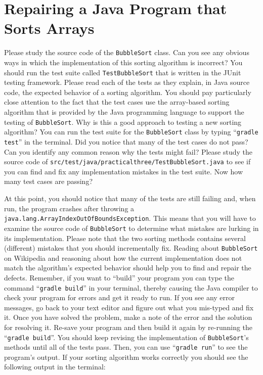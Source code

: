 \documentclass[11pt]{article}
\newcommand{\mainprogram}{\lstinline{BubbleSort}}
\newcommand{\testprogram}{\lstinline{TestBubbleSort}}
\newcommand{\testprogramsource}{\lstinline{src/test/java/practicalthree/TestBubbleSort.java}}
\newcommand{\gradlebuild}{\command{gradle build}}
\newcommand{\gradletest}{\command{gradle test}}
\newcommand{\gradlerun}{\command{gradle run}}
\newcommand{\command}[1]{``\lstinline{#1}''}
\newcommand{\program}[1]{\lstinline{#1}}
\newcommand{\step}[1]{``{#1}''}
\begin{document}
\section*{Repairing a Java Program that Sorts Arrays}

Please study the source code of the \mainprogram{} class. Can you see any
obvious ways in which the implementation of this sorting algorithm is incorrect?
You should run the test suite called \testprogram{} that is written in the JUnit
testing framework. Please read each of the tests as they explain, in Java source
code, the expected behavior of a sorting algorithm. You should pay particularly
close attention to the fact that the test cases use the array-based sorting
algorithm that is provided by the Java programming language to support the
testing of \mainprogram{}. Why is this a good approach to testing a new sorting
algorithm? You can run the test suite for the \mainprogram{} class by typing
\gradletest{} in the terminal. Did you notice that many of the test cases do not
pass? Can you identify any common reason why the tests might fail? Please study
the source code of \testprogramsource{} to see if you can find and fix any
implementation mistakes in the test suite. Now how many test cases are passing?

At this point, you should notice that many of the tests are still failing and,
when run, the program crashes after throwing a
\program{java.lang.ArrayIndexOutOfBoundsException}. This means that you will
have to examine the source code of \mainprogram{} to determine what mistakes are
lurking in its implementation. Please note that the two sorting methods contains
several (different) mistakes that you should incrementally fix. Reading about
\mainprogram{} on Wikipedia and reasoning about how the current implementation
does not match the algorithm's expected behavior should help you to find and
repair the defects. Remember, if you want to \step{build} your program you can
type the command \gradlebuild{} in your terminal, thereby causing the Java
compiler to check your program for errors and get it ready to run. If you see
any error messages, go back to your text editor and figure out what you
mis-typed and fix it. Once you have solved the problem, make a note of the error
and the solution for resolving it. Re-save your program and then build it again
by re-running the \gradlebuild{}. You should keep revising the implementation of
\mainprogram's methods until all of the tests pass. Then, you can use
\gradlerun{} to see the program's output. If your sorting algorithm works
correctly you should see the following output in the terminal:
\end{document}
